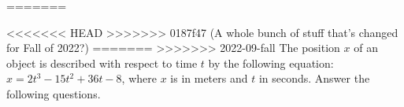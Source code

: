 \documentclass{../../oss-apphys-exam}
\newcounter{lastmc}
\begin{document}
\begin{questions}
=======

\begin{questions}
  \setcounter{question}{\value{lastmc}}
  
<<<<<<< HEAD
>>>>>>> 0187f47 (A whole bunch of stuff that's changed for Fall of 2022?)
=======
>>>>>>> 2022-09-fall
  \question The position $x$ of an object is described with respect to time $t$
  by the following equation: $x=2t^3-15t^2+36t-8$, where $x$ is in meters and
  $t$ in seconds. Answer the following questions.
\end{questions}
\end{questions}
\end{document}
